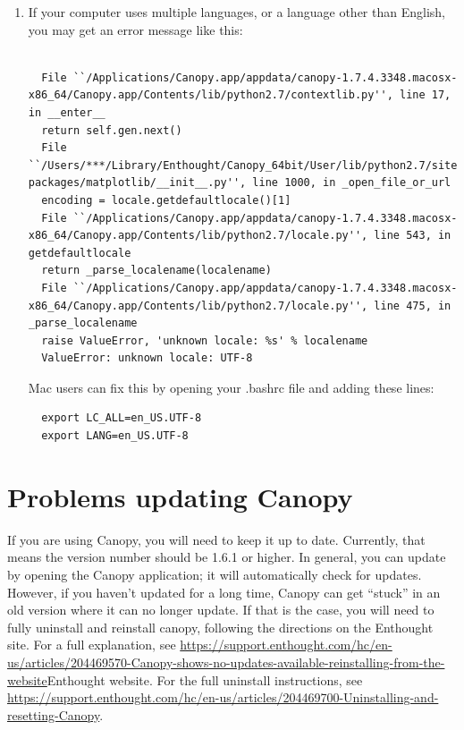\documentclass[11pt]{book}
\begin{document}
{{{{{{\begin{enumerate}
\item
  If your computer uses multiple languages, or a language other than English, you may get an error message like this:
  \begin{verbatim}

  File ``/Applications/Canopy.app/appdata/canopy-1.7.4.3348.macosx-x86_64/Canopy.app/Contents/lib/python2.7/contextlib.py'', line 17, in __enter__
  return self.gen.next()
  File ``/Users/***/Library/Enthought/Canopy_64bit/User/lib/python2.7/site-packages/matplotlib/__init__.py'', line 1000, in _open_file_or_url
  encoding = locale.getdefaultlocale()[1]
  File ``/Applications/Canopy.app/appdata/canopy-1.7.4.3348.macosx-x86_64/Canopy.app/Contents/lib/python2.7/locale.py'', line 543, in getdefaultlocale
  return _parse_localename(localename)
  File ``/Applications/Canopy.app/appdata/canopy-1.7.4.3348.macosx-x86_64/Canopy.app/Contents/lib/python2.7/locale.py'', line 475, in _parse_localename
  raise ValueError, 'unknown locale: %s' % localename
  ValueError: unknown locale: UTF-8
  \end{verbatim}
  Mac users can fix this by opening your .bashrc file and adding these lines:
  \begin{verbatim}
  export LC_ALL=en_US.UTF-8
  export LANG=en_US.UTF-8
  \end{verbatim}

\end{enumerate}

\section{Problems updating Canopy}
If you are using Canopy, you will need to keep it up to date.  Currently, that means the version number should be 1.6.1 or higher.  In general, you can update by opening the Canopy application; it will automatically check for updates.  However, if you haven't updated for a long time, Canopy can get ``stuck'' in an old version where it can no longer update.  If that is the case, you will need to fully uninstall and reinstall canopy, following the directions on the Enthought site.  For a full explanation, see \href{this support article}{https://support.enthought.com/hc/en-us/articles/204469570-Canopy-shows-no-updates-available-reinstalling-from-the-website}{Enthought website}.  For the full uninstall instructions, see \href{these directions}{https://support.enthought.com/hc/en-us/articles/204469700-Uninstalling-and-resetting-Canopy}.

}}}}}}
\end{document}
